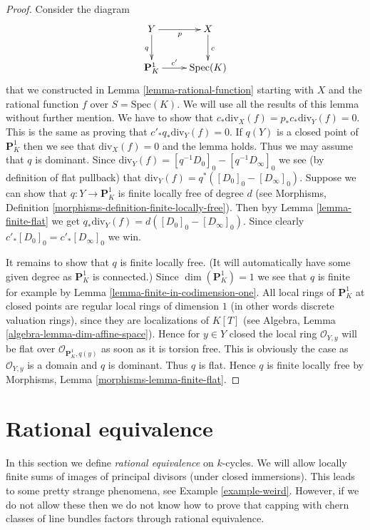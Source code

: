 \begin{proof}
Consider the diagram
$$
\xymatrix{
Y \ar[r]_p \ar[d]_q & X \ar[d]^c \\
\mathbf{P}^1_K \ar[r]^-{c'} & \text{Spec}(K)
}
$$
that we constructed in Lemma \ref{lemma-rational-function}
starting with $X$ and the rational function $f$ over $S = \text{Spec}(K)$.
We will use all the results of this lemma without further mention.
We have to show that $c_*\text{div}_X(f) = p_*c_*\text{div}_Y(f) = 0$.
This is the same as proving that $c'_*q_*\text{div}_Y(f) = 0$.
If $q(Y)$ is a closed point of $\mathbf{P}^1_K$ then we
see that $\text{div}_X(f) = 0$ and the lemma holds.
Thus we may assume that $q$ is dominant.
Since $\text{div}_Y(f) = [q^{-1}D_0]_0 - [q^{-1}D_\infty]_0$
we see (by definition of flat pullback) that
$\text{div}_Y(f) = q^*([D_0]_0 - [D_\infty]_0)$.
Suppose we can show that $q : Y \to \mathbf{P}^1_K$ is finite
locally free of degree $d$ (see
Morphisms, Definition \ref{morphisms-definition-finite-locally-free}).
Then byy Lemma \ref{lemma-finite-flat} we get
$q_*\text{div}_Y(f) = d([D_0]_0 - [D_\infty]_0)$.
Since clearly $c'_*[D_0]_0 = c'_*[D_\infty]_0$ we win.

\medskip\noindent
It remains to show that $q$ is finite locally free.
(It will automatically have some given degree as $\mathbf{P}^1_K$
is connected.)
Since $\dim(\mathbf{P}^1_K) = 1$ we see that $q$ is finite for example
by Lemma \ref{lemma-finite-in-codimension-one}.
All local rings of $\mathbf{P}^1_K$ at
closed points are regular local rings of dimension $1$
(in other words discrete valuation rings), since they are
localizations of $K[T]$ (see
Algebra, Lemma \ref{algebra-lemma-dim-affine-space}).
Hence for $y\in Y$ closed the local ring $\mathcal{O}_{Y, y}$
will be flat over $\mathcal{O}_{\mathbf{P}^1_K, q(y)}$ as soon as
it is torsion free. This is obviously the case as
$\mathcal{O}_{Y, y}$ is a domain and $q$ is dominant.
Thus $q$ is flat. Hence $q$ is finite locally free by
Morphisms, Lemma \ref{morphisms-lemma-finite-flat}.
\end{proof}





\section{Rational equivalence}
\label{section-rational-equivalence}

\noindent
In this section we define {\it rational equivalence} on $k$-cycles.
We will allow locally finite sums of images of
principal divisors (under closed immersions). This leads to some
pretty strange phenomena, see Example \ref{example-weird}.
However, if we do not allow these then we do not know how to prove that
capping with chern classes of line bundles factors through rational
equivalence.

